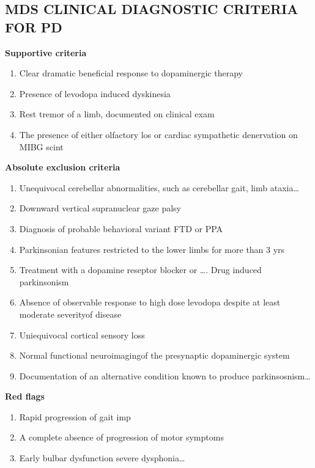 \documentclass[pdf,  style=code128, globalid=OMRCRFv5.0.2, english, stamp, pagemark, oneside]{sdapsclassic}
\begin{document}
\begin{questionnaire}
    \section{MDS CLINICAL DIAGNOSTIC CRITERIA FOR PD}
           \begin{tcolorbox}
            \textbf{Supportive criteria}
            \begin{enumerate}
              \item Clear dramatic beneficial response to dopaminergic therapy
              \item Presence of levodopa induced dyskinesia
              \item Rest tremor of a limb, documented on clinical exam
              \item The presence of either olfactory los or cardiac sympathetic denervation on MIBG scint
            \end{enumerate}
            \textbf{Absolute exclusion criteria}
            \begin{enumerate}
              \item Unequivocal cerebellar abnormalities, such as cerebellar gait, limb ataxia…
              \item Downward vertical supranuclear gaze palsy
              \item Diagnosis of probable behavioral variant FTD or PPA
              \item Parkinsonian features restricted to the lower limbs for more than 3 yrs
              \item Treatment with a dopamine reseptor blocker or …. Drug induced parkinsonism
              \item Absence of observable response to high dose levodopa despite at least moderate severityof disease
              \item Uniequivocal cortical sensory loss
              \item Normal functional neuroimagingof the presynaptic dopaminergic system
              \item Documentation of an alternative condition known to produce parkinsosnism…
            \end{enumerate}
            \textbf{Red flags}
            \begin{enumerate}
              \item Rapid progression of gait imp
              \item A complete absence of progression of motor symptoms
              \item Early bulbar dysfunction severe dysphonia…

\end{enumerate}
\end{tcolorbox}
\end{questionnaire}
\end{document}
